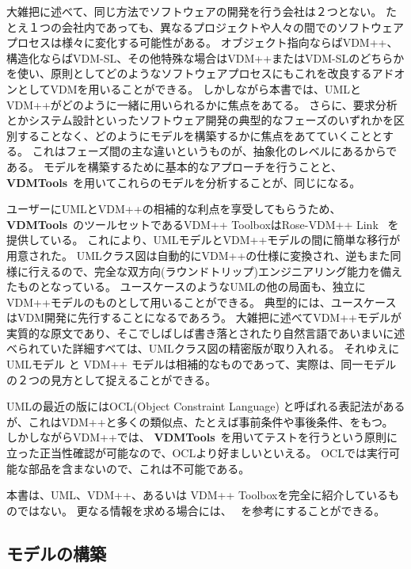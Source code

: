 \documentclass[\pformat,12pt,twoside]{jarticle}
\newcommand{\vdmtools}{\textbf{VDMTools}}
\begin{document}
大雑把に述べて、同じ方法でソフトウェアの開発を行う会社は２つとない。
たとえ１つの会社内であっても、異なるプロジェクトや人々の間でのソフトウェアプロセスは様々に変化する可能性がある。
オブジェクト指向ならばVDM++、構造化ならばVDM-SL、その他特殊な場合はVDM++またはVDM-SLのどちらかを使い、原則としてどのようなソフトウェアプロセスにもこれを改良するアドオンとしてVDMを用いることができる。
しかしながら本書では、UMLとVDM++がどのように一緒に用いられるかに焦点をあてる。
さらに、要求分析とかシステム設計といったソフトウェア開発の典型的なフェーズのいずれかを区別することなく、どのようにモデルを構築するかに焦点をあてていくこととする。
これはフェーズ間の主な違いというものが、抽象化のレベルにあるからである。
モデルを構築するために基本的なアプローチを行うことと、 \vdmtools\ を用いてこれらのモデルを分析することが、同じになる。

ユーザーにUMLとVDM++の相補的な利点を享受してもらうため、\vdmtools\ のツールセットであるVDM++ ToolboxはRose-VDM++ Link \cite{UMLMan-SCSK}\ を提供している。
これにより、UMLモデルとVDM++モデルの間に簡単な移行が用意された。
UMLクラス図は自動的にVDM++の仕様に変換され、逆もまた同様に行えるので、完全な双方向(ラウンドトリップ)エンジニアリング能力を備えたものとなっている。
ユースケースのようなUMLの他の局面も、独立にVDM++モデルのものとして用いることができる。
典型的には、ユースケースはVDM開発に先行することになるであろう。
大雑把に述べてVDM++モデルが実質的な原文であり、そこでしばしば書き落とされたり自然言語であいまいに述べられていた詳細すべては、UMLクラス図の精密版が取り入れる。
それゆえにUMLモデル と VDM++ モデルは相補的なものであって、実際は、同一モデルの２つの見方として捉えることができる。

UMLの最近の版にはOCL(Object Constraint Language) と呼ばれる表記法があるが、これはVDM++と多くの類似点、たとえば事前条件や事後条件、をもつ。
しかしながらVDM++では、 \vdmtools\ を用いてテストを行うという原則に立った正当性確認が可能なので、OCLより好ましいといえる。
OCLでは実行可能な部品を含まないので、これは不可能である。 

本書は、UML、VDM++、あるいは VDM++ Toolboxを完全に紹介しているものではない。
更なる情報を求める場合には、 \cite{Booch&99,LangManPP-SCSK,UserManPP-SCSK}\ を参考にすることができる。

\subsection{モデルの構築}
\end{document}
